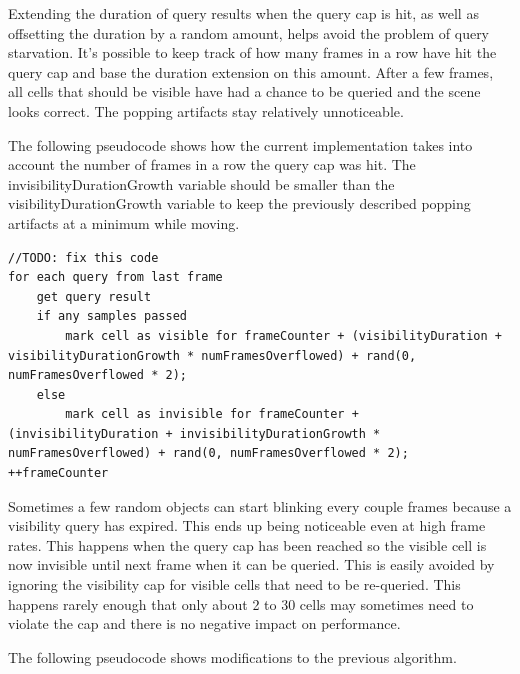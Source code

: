 \documentclass[12pt]{ucthesis}
\begin{document}
Extending the duration of query results when the query cap is hit, as well as offsetting the duration by a random amount, helps avoid the problem of query starvation.
It's possible to keep track of how many frames in a row have hit the query cap and base the duration extension on this amount.
After a few frames, all cells that should be visible have had a chance to be queried and the scene looks correct.
The popping artifacts stay relatively unnoticeable.

The following pseudocode shows how the current implementation takes into account the number of frames in a row the query cap was hit.  The invisibilityDurationGrowth variable should be smaller than the visibilityDurationGrowth variable to keep the previously described popping artifacts at a minimum while moving.

\begin{lstlisting}
//TODO: fix this code
for each query from last frame
	get query result
	if any samples passed
		mark cell as visible for frameCounter + (visibilityDuration + visibilityDurationGrowth * numFramesOverflowed) + rand(0, numFramesOverflowed * 2);
	else
		mark cell as invisible for frameCounter + (invisibilityDuration + invisibilityDurationGrowth * numFramesOverflowed) + rand(0, numFramesOverflowed * 2);
++frameCounter
\end{lstlisting}

Sometimes a few random objects can start blinking every couple frames because a visibility query has expired.
This ends up being noticeable even at high frame rates.
This happens when the query cap has been reached so the visible cell is now invisible until next frame when it can be queried.
This is easily avoided by ignoring the visibility cap for visible cells that need to be re-queried.
This happens rarely enough that only about 2 to 30 cells may sometimes need to violate the cap and there is no negative impact on performance.

The following pseudocode shows modifications to the previous algorithm.
\end{document}
